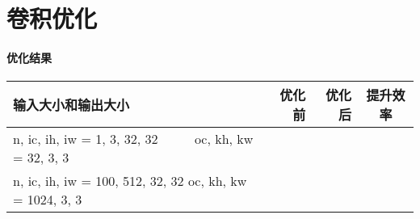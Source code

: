 \documentclass[UTF8]{ctexart}
\begin{document}
\part{卷积优化}
\subsection*{优化结果}
\begin{table}[H]
    \begin{tabular}{m{17em}rrc}
        \toprule
        输入大小和输出大小 & 优化前 & 优化后 & 提升效率 \\
        \midrule
        \ttfamily
        n, ic, ih, iw = 1, 3, 32, 32~~~~~
        oc, kh, kw = 32, 3, 3
        & & & \\
        \hline
        \ttfamily
        n, ic, ih, iw = 100, 512, 32, 32
        oc, kh, kw = 1024, 3, 3
        & & & \\
        \bottomrule
    \end{tabular}
\end{table}


\end{document}

